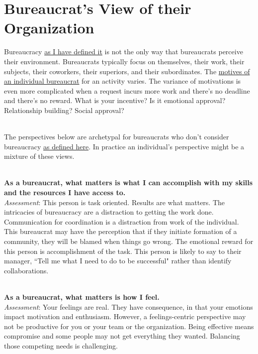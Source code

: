 \section{Bureaucrat's View of their Organization\label{sec:alternative-views-from-within}}

Bureaucracy \hyperref[sec:define-bureaucracy]{as I have defined it} 
is not the only way that bureaucrats perceive their environment. Bureaucrats typically focus on themselves, their work, their subjects, their coworkers, their superiors, and their subordinates. The \hyperref[sec:motivations]{motives of an individual bureaucrat} for an activity varies.
The variance of motivations is even more complicated when a request incurs more work and there's no deadline and there's no reward. What is your incentive? Is it emotional approval? Relationship building? Social approval?

\ \\

The perspectives below are archetypal for bureaucrats who don't consider bureaucracy \hyperref[sec:define-bureaucracy]{as defined here}.
In practice an individual's perspective might be a mixture of these views.

\ \\
\textbf{As a bureaucrat, what matters is what I can accomplish with my skills and the resources I have access to.} \\
\textit{Assessment}: This person is task oriented. Results are what matters. The intricacies of bureaucracy are a distraction to getting the work done. 
Communication  for coordination is a distraction from work of the individual. 
This bureaucrat may have the perception that if they initiate formation of a community, they will be blamed when things go wrong.
The emotional reward for this person is accomplishment of the task. This person is likely to say to their manager, ``Tell me what I need to do to be successful" rather than identify collaborations.

\ \\
\textbf{As a bureaucrat, what matters is how I feel.} \\
\textit{Assessment}: Your feelings are real. They have consequence, in that your emotions impact motivation and enthusiasm. However, a feelings-centric perspective may not be productive for you or your team or the organization. Being effective means compromise and some people may not get everything they wanted. Balancing those competing needs is challenging.

